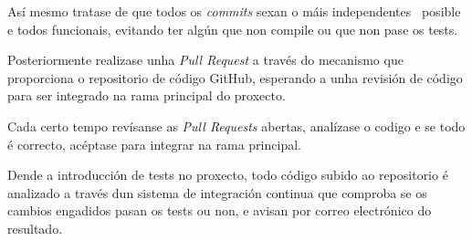 Así mesmo tratase de que todos os \emph{commits} sexan o máis
independentes~ posible e todos
funcionais, evitando ter algún que non compile
ou que non pase os tests.

Posteriormente realizase unha \emph{Pull Request} a
través do mecanismo que proporciona o repositorio de código GitHub, esperando a unha
revisión de código para ser integrado na rama principal do proxecto.

    Cada certo tempo revísanse as \emph{Pull Requests} abertas, analízase o 
codigo e se todo é correcto, acéptase para integrar na rama principal.

    Dende a introducción de tests no proxecto, todo código subido ao 
repositorio é analizado a través dun sistema de integración continua que 
comproba se os cambios engadidos pasan os tests ou non, e avisan por correo 
electrónico do resultado.



